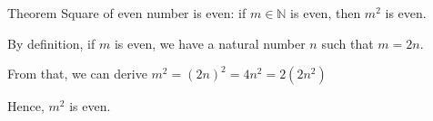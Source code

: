 Theorem Square of even number is even: if $m \in \mathbb{N}$ is even, then $m^2$ is even.

By definition, if $m$ is even, we have a natural number $n$ such that $m = 2n$.

From that, we can derive $m^2 = (2n)^2 = 4n^2 = 2(2n^2)$

Hence, $m^2$ is even.